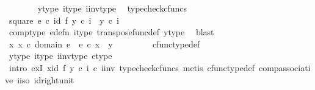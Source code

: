 \begin{isabellebody}
\ \ \ \ \ \ \isamarkupfalse%
\ y{\isacharunderscore}{\kern0pt}type\ i{\isacharunderscore}{\kern0pt}type\ i{\isacharunderscore}{\kern0pt}inv{\isacharunderscore}{\kern0pt}type\ \isamarkupfalse%
\ typecheck{\isacharunderscore}{\kern0pt}cfuncs\isanewline
\isanewline
\ \ \ \ \isamarkupfalse%
\ square{\isacharcolon}{\kern0pt}\ {\isachardoublequoteopen}e\ {\isasymcirc}\isactrlsub c\ {\isacharparenleft}{\kern0pt}id{\isacharparenleft}{\kern0pt}{\isasymone}{\isacharparenright}{\kern0pt}\ {\isasymtimes}\isactrlsub f\ {\isacharparenleft}{\kern0pt}y\ {\isasymcirc}\isactrlsub c\ i{\isacharparenright}{\kern0pt}\isactrlsup {\isasymsharp}{\isacharparenright}{\kern0pt}\ {\isacharequal}{\kern0pt}\ y\ {\isasymcirc}\isactrlsub c\ i{\isachardoublequoteclose}\isanewline
\ \ \ \ \ \ \isamarkupfalse%
\ comp{\isacharunderscore}{\kern0pt}type\ e{\isacharunderscore}{\kern0pt}defn\ i{\isacharunderscore}{\kern0pt}type\ transpose{\isacharunderscore}{\kern0pt}func{\isacharunderscore}{\kern0pt}def\ y{\isacharunderscore}{\kern0pt}type\ \isamarkupfalse%
\ blast\isanewline
\ \ \ \ \isamarkupfalse%
\ \isamarkupfalse%
\ {\isachardoublequoteopen}{\isasymexists}x{\isachardot}{\kern0pt}\ x\ {\isasymin}\isactrlsub c\ domain\ e\ {\isasymand}\ e\ {\isasymcirc}\isactrlsub c\ x\ {\isacharequal}{\kern0pt}\ y{\isachardoublequoteclose}\ \isanewline
\ \ \ \ \ \ \isamarkupfalse%
\ cfunc{\isacharunderscore}{\kern0pt}type{\isacharunderscore}{\kern0pt}def\ \isamarkupfalse%
\ y{\isacharunderscore}{\kern0pt}type\ i{\isacharunderscore}{\kern0pt}type\ i{\isacharunderscore}{\kern0pt}inv{\isacharunderscore}{\kern0pt}type\ e{\isacharunderscore}{\kern0pt}type\ \isanewline
\ \ \ \ \ \ \isamarkupfalse%
\ {\isacharparenleft}{\kern0pt}intro\ exI{\isacharbrackleft}{\kern0pt}\ x{\isacharequal}{\kern0pt}{\isachardoublequoteopen}{\isacharparenleft}{\kern0pt}id{\isacharparenleft}{\kern0pt}{\isasymone}{\isacharparenright}{\kern0pt}\ {\isasymtimes}\isactrlsub f\ {\isacharparenleft}{\kern0pt}y\ {\isasymcirc}\isactrlsub c\ i{\isacharparenright}{\kern0pt}\isactrlsup {\isasymsharp}{\isacharparenright}{\kern0pt}\ {\isasymcirc}\isactrlsub c\ i{\isacharunderscore}{\kern0pt}inv{\isachardoublequoteclose}{\isacharbrackright}{\kern0pt}{\isacharcomma}{\kern0pt}\ typecheck{\isacharunderscore}{\kern0pt}cfuncs{\isacharcomma}{\kern0pt}\ metis\ cfunc{\isacharunderscore}{\kern0pt}type{\isacharunderscore}{\kern0pt}def\ comp{\isacharunderscore}{\kern0pt}associative\ i{\isacharunderscore}{\kern0pt}iso\ id{\isacharunderscore}{\kern0pt}right{\isacharunderscore}{\kern0pt}unit{}{\isacharparenright}{\kern0pt}\isanewline

\end{isabellebody}
